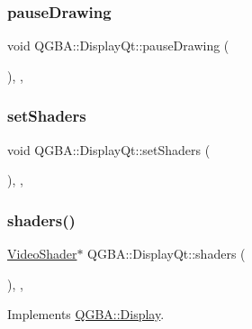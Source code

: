 \subsubsection{\texorpdfstring{pause\+Drawing}{pauseDrawing}}
{\footnotesize\ttfamily void Q\+G\+B\+A\+::\+Display\+Qt\+::pause\+Drawing (\begin{DoxyParamCaption}{ }\end{DoxyParamCaption})\hspace{0.3cm}{\ttfamily [inline]}, {\ttfamily [override]}, {\ttfamily [slot]}}

\mbox{\label{class_q_g_b_a_1_1_display_qt_a60f60470997bb4c4c46ce9598d78e106}} 
\subsubsection{\texorpdfstring{set\+Shaders}{setShaders}}
{\footnotesize\ttfamily void Q\+G\+B\+A\+::\+Display\+Qt\+::set\+Shaders (\begin{DoxyParamCaption}\item[{struct V\+Dir $\ast$}]{ }\end{DoxyParamCaption})\hspace{0.3cm}{\ttfamily [inline]}, {\ttfamily [override]}, {\ttfamily [slot]}}

\mbox{\label{class_q_g_b_a_1_1_display_qt_a9a92bfeed37ab4ebf5dcad5f573cd9e9}} 
\subsubsection{\texorpdfstring{shaders()}{shaders()}}
{\footnotesize\ttfamily \mbox{\hyperlink{video-backend_8h_struct_video_shader}{Video\+Shader}}$\ast$ Q\+G\+B\+A\+::\+Display\+Qt\+::shaders (\begin{DoxyParamCaption}{ }\end{DoxyParamCaption})\hspace{0.3cm}{\ttfamily [inline]}, {\ttfamily [override]}, {\ttfamily [virtual]}}



Implements \mbox{\hyperlink{class_q_g_b_a_1_1_display_a540a06ee94dbfcd93fb1b2a7e2d0bbf8}{Q\+G\+B\+A\+::\+Display}}.

